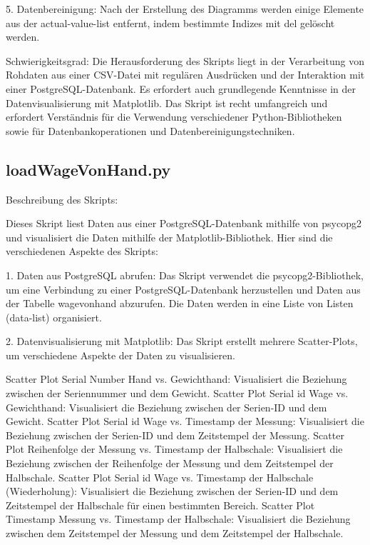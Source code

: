 5. Datenbereinigung:
Nach der Erstellung des Diagramms werden einige Elemente aus der actual-value-list entfernt, indem bestimmte Indizes mit del gelöscht werden.

Schwierigkeitsgrad:
Die Herausforderung des Skripts liegt in der Verarbeitung von Rohdaten aus einer CSV-Datei mit regulären Ausdrücken und der Interaktion mit einer PostgreSQL-Datenbank. Es erfordert auch grundlegende Kenntnisse in der Datenvisualisierung mit Matplotlib. Das Skript ist recht umfangreich und erfordert Verständnis für die Verwendung verschiedener Python-Bibliotheken sowie für Datenbankoperationen und Datenbereinigungstechniken.

\subsection{loadWageVonHand.py}
Beschreibung des Skripts:

Dieses Skript liest Daten aus einer PostgreSQL-Datenbank mithilfe von psycopg2 und visualisiert die Daten mithilfe der Matplotlib-Bibliothek. Hier sind die verschiedenen Aspekte des Skripts:

1. Daten aus PostgreSQL abrufen:
Das Skript verwendet die psycopg2-Bibliothek, um eine Verbindung zu einer PostgreSQL-Datenbank herzustellen und Daten aus der Tabelle wagevonhand abzurufen. Die Daten werden in eine Liste von Listen (data-list) organisiert.

2. Datenvisualisierung mit Matplotlib:
Das Skript erstellt mehrere Scatter-Plots, um verschiedene Aspekte der Daten zu visualisieren.

    Scatter Plot Serial Number Hand vs. Gewichthand: Visualisiert die Beziehung zwischen der Seriennummer und dem Gewicht.
    Scatter Plot Serial id Wage vs. Gewichthand: Visualisiert die Beziehung zwischen der Serien-ID und dem Gewicht.
    Scatter Plot Serial id Wage vs. Timestamp der Messung: Visualisiert die Beziehung zwischen der Serien-ID und dem Zeitstempel der Messung.
    Scatter Plot Reihenfolge der Messung vs. Timestamp der Halbschale: Visualisiert die Beziehung zwischen der Reihenfolge der Messung und dem Zeitstempel der Halbschale.
    Scatter Plot Serial id Wage vs. Timestamp der Halbschale (Wiederholung): Visualisiert die Beziehung zwischen der Serien-ID und dem Zeitstempel der Halbschale für einen bestimmten Bereich.
    Scatter Plot Timestamp Messung vs. Timestamp der Halbschale: Visualisiert die Beziehung zwischen dem Zeitstempel der Messung und dem Zeitstempel der Halbschale.

